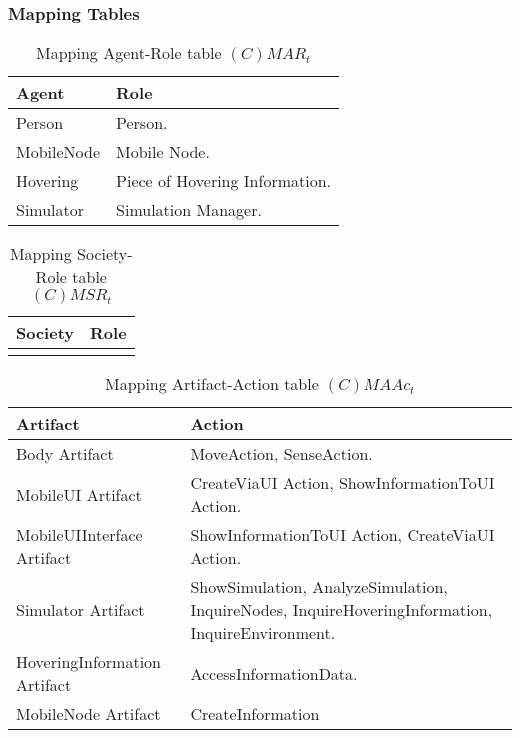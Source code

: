 \subsubsection{Mapping Tables}

\begin{table}[H]
	\centering
	\begin{tabular}{|p{4cm}|p{8cm}|}
			\hline
			\textbf{Agent} & \textbf{Role} \\
			\hline
			Person & Person. \\
			\hline
			MobileNode & Mobile Node.  \\
			\hline
			Hovering & Piece of Hovering Information. \\
			\hline
			Simulator & Simulation Manager. \\
			\hline
		\end{tabular}
	\caption{Mapping Agent-Role table $(C)MAR_t$}
	\label{tab:cmart}
\end{table}

\begin{table}[H]
	\centering
	\begin{tabular}{|p{4cm}|p{8cm}|}
			\hline
			\textbf{Society} & \textbf{Role} \\
			\hline
			& \\
			\hline
		\end{tabular}
	\caption{Mapping Society-Role table $(C)MSR_t$}
	\label{tab:cmsrt}
\end{table}

\begin{table}[H]
	\centering
	\begin{tabular}{|p{4cm}|p{8cm}|}
			\hline
			\textbf{Artifact} & \textbf{Action} \\
			\hline
			Body Artifact & MoveAction, SenseAction. \\
			\hline
			MobileUI Artifact & CreateViaUI Action, ShowInformationToUI Action. \\
			\hline
			MobileUIInterface Artifact & ShowInformationToUI Action, CreateViaUI Action. \\
			\hline
      Simulator Artifact & ShowSimulation, AnalyzeSimulation,
      InquireNodes, InquireHoveringInformation, InquireEnvironment. \\
			\hline
			HoveringInformation Artifact & AccessInformationData. \\
			\hline
			MobileNode Artifact & CreateInformation \\
			\hline
		\end{tabular}
	\caption{Mapping Artifact-Action table $(C)MAAc_t$}
	\label{tab:cmaact}
\end{table}

